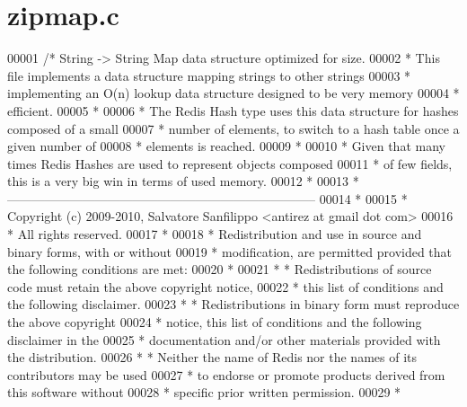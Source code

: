 \hypertarget{zipmap_8c_source}{}\section{zipmap.\+c}
\label{zipmap_8c_source}

\begin{DoxyCode}
00001 \textcolor{comment}{/* String -> String Map data structure optimized for size.}
00002 \textcolor{comment}{ * This file implements a data structure mapping strings to other strings}
00003 \textcolor{comment}{ * implementing an O(n) lookup data structure designed to be very memory}
00004 \textcolor{comment}{ * efficient.}
00005 \textcolor{comment}{ *}
00006 \textcolor{comment}{ * The Redis Hash type uses this data structure for hashes composed of a small}
00007 \textcolor{comment}{ * number of elements, to switch to a hash table once a given number of}
00008 \textcolor{comment}{ * elements is reached.}
00009 \textcolor{comment}{ *}
00010 \textcolor{comment}{ * Given that many times Redis Hashes are used to represent objects composed}
00011 \textcolor{comment}{ * of few fields, this is a very big win in terms of used memory.}
00012 \textcolor{comment}{ *}
00013 \textcolor{comment}{ * --------------------------------------------------------------------------}
00014 \textcolor{comment}{ *}
00015 \textcolor{comment}{ * Copyright (c) 2009-2010, Salvatore Sanfilippo <antirez at gmail dot com>}
00016 \textcolor{comment}{ * All rights reserved.}
00017 \textcolor{comment}{ *}
00018 \textcolor{comment}{ * Redistribution and use in source and binary forms, with or without}
00019 \textcolor{comment}{ * modification, are permitted provided that the following conditions are met:}
00020 \textcolor{comment}{ *}
00021 \textcolor{comment}{ *   * Redistributions of source code must retain the above copyright notice,}
00022 \textcolor{comment}{ *     this list of conditions and the following disclaimer.}
00023 \textcolor{comment}{ *   * Redistributions in binary form must reproduce the above copyright}
00024 \textcolor{comment}{ *     notice, this list of conditions and the following disclaimer in the}
00025 \textcolor{comment}{ *     documentation and/or other materials provided with the distribution.}
00026 \textcolor{comment}{ *   * Neither the name of Redis nor the names of its contributors may be used}
00027 \textcolor{comment}{ *     to endorse or promote products derived from this software without}
00028 \textcolor{comment}{ *     specific prior written permission.}
00029 \textcolor{comment}{ *}

\end{DoxyCode}
